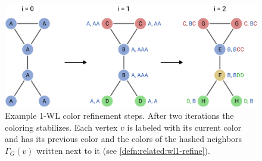 \begin{figure}[ht]
	\centering
	\includegraphics[width=0.75\linewidth]{gfx/related-work/wl1-refine.pdf}
	\caption[Example 1-WL color refinement steps.]{
		Example 1-WL color refinement steps.
		After two iterations the coloring stabilizes.
		Each vertex $v$ is labeled with its current color and has its previous color and the colors of the hashed neighbors $\Gamma_G(v)$ written next to it (see \cref{defn:related:wl1-refine}).
	}\label{fig:related:wl1-refine}
\end{figure}

